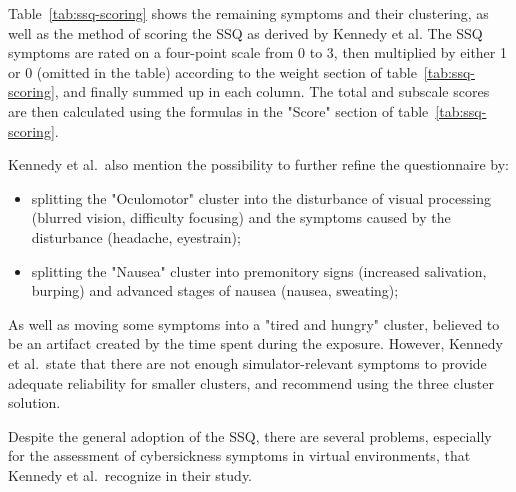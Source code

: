 Table~\ref{tab:ssq-scoring} shows the remaining symptoms and their clustering, as well as the method of scoring the
SSQ as derived by Kennedy et al.
The SSQ symptoms are rated on a four-point scale from 0 to 3, then multiplied by either 1 or 0 (omitted in the table)
according to the weight section of table~\ref{tab:ssq-scoring}, and finally summed up in each column.
The total and subscale scores are then calculated using the formulas in the "Score" section of
table~\ref{tab:ssq-scoring}.

Kennedy et al.\ also mention the possibility to further refine the questionnaire by:
\begin{itemize}
    \item splitting the "Oculomotor" cluster into the disturbance of visual processing (blurred vision, difficulty
    focusing) and the symptoms caused by the disturbance (headache, eyestrain);
    \item splitting the "Nausea" cluster into premonitory signs (increased salivation, burping) and advanced stages
    of nausea (nausea, sweating);
\end{itemize}
As well as moving some symptoms into a "tired and hungry" cluster, believed to be an artifact created by the time
spent during the exposure.
However, Kennedy et al.\ state that there are not enough simulator-relevant symptoms to provide adequate reliability
for smaller clusters, and recommend using the three cluster solution.

Despite the general adoption of the SSQ, there are several problems, especially for the assessment of
cybersickness symptoms in virtual environments, that Kennedy et al.\ recognize in their study.


